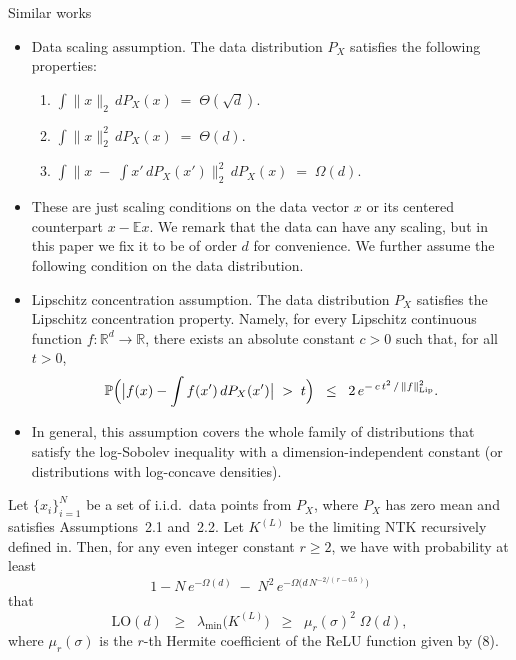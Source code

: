 \documentclass[serif, aspectratio=169]{beamer}
\begin{document}
\begin{frame}{Similar works}
	\begin{itemize}
		\item Data scaling assumption.
		The data distribution $P_X$ satisfies the following properties:
		\begin{enumerate}
			\item $\displaystyle \int \|x\|_{2}\, dP_X(x) \;=\; \Theta(\sqrt{d}).$
			\item $\displaystyle \int \|x\|_{2}^{2}\, dP_X(x) \;=\; \Theta(d).$
			\item $\displaystyle \int \bigl\|x \;-\; \int x' \, dP_X(x')\bigr\|_{2}^{2}\, dP_X(x) 
			\;=\; \Omega(d).$
		\end{enumerate}
		\item These are just scaling conditions on the data vector $x$ or its centered 
		counterpart $x - \mathbb{E}x$. We remark that the data can have any scaling, 
		but in this paper we fix it to be of order $d$ for convenience. We further 
		assume the following condition on the data distribution.
		
		
	\end{itemize}
\end{frame}

\begin{frame}
	\begin{itemize}
		\item Lipschitz concentration assumption.
		The data distribution $P_X$ satisfies the Lipschitz concentration property. 
		Namely, for every Lipschitz continuous function 
		$f : \mathbb{R}^d \to \mathbb{R}$, there exists an absolute constant $c > 0$ 
		such that, for all $t > 0$,
		\[
		\mathbb{P}\Bigl(\bigl|f(x) - \int f(x')\,dP_X(x')\bigr| \;>\; t\Bigr)
		\;\;\le\;\; 2\,e^{-\,c\,t^2\,/\,\|f\|_{\mathrm{Lip}}^2}.
		\]
		\item In general, this assumption covers the whole family of distributions that satisfy 
		the log-Sobolev inequality with a dimension-independent constant (or distributions
		with log-concave densities).
	\end{itemize}
\end{frame}


\begin{frame}
	\begin{theorem}
		\label{thm:smallest-eig-NTK}
		Let $\{x_i\}_{i=1}^N$ be a set of i.i.d.\ data points from $P_X$, where $P_X$ has 
		zero mean and satisfies Assumptions~2.1 and~2.2. Let $K^{(L)}$ be the limiting 
		NTK recursively defined in. Then, for any even integer constant $r \ge 2$, 
		we have with probability at least 
		\[
		1 - N\,e^{-\Omega(d)} \;-\; N^2\,e^{-\Omega\bigl(d\,N^{-2/(\,r - 0.5\,)}\bigr)}
		\]
		that
		\[
		\mathrm{LO}(d) 
		\;\;\ge\;\;
		\lambda_{\min}\bigl(K^{(L)}\bigr) 
		\;\;\ge\;\;
		\mu_{r}(\sigma)^{2}\;\Omega(d),
		\]
		where $\mu_{r}(\sigma)$ is the $r$-th Hermite coefficient of the ReLU function 
		given by (8).
	\end{theorem}
\end{frame}
\end{document}
